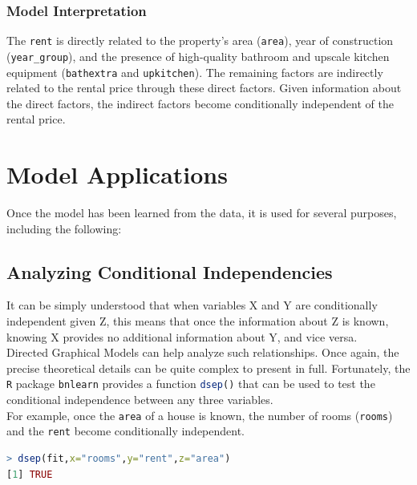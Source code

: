 \documentclass[15pt,a4paper]{report}
\begin{document}
\subsubsection*{Model Interpretation}
 The \lstinline[language=R]|rent| is directly related to the property's area (\lstinline[language=R]|area|), year of construction (\lstinline[language=R]|year_group|), and the presence of high-quality bathroom and upscale kitchen equipment (\lstinline[language=R]|bathextra| and \lstinline[language=R]|upkitchen|). The remaining factors are indirectly related to the rental price through these direct factors. Given information about the direct factors, the indirect factors become conditionally independent of the rental price.
\section*{Model Applications}
Once the model has been learned from the data, it is used for several purposes, including the following:
\subsection*{Analyzing Conditional Independencies}
It can be simply understood that when variables X and Y are conditionally independent given Z, this means that once the information about Z is known, knowing X provides no additional information about Y, and vice versa.\\

Directed Graphical Models can help analyze such relationships. Once again, the precise theoretical details can be quite complex to present in full. Fortunately, the \lstinline[language=R]|R| package \lstinline[language=R]|bnlearn| provides a function \lstinline[language=R]|dsep()| that can be used to test the conditional independence between any three variables. \\

For example, once the \lstinline[language=R]|area| of a house is known, the number of rooms (\lstinline[language=R]|rooms|) and the \lstinline[language=R]|rent| become conditionally independent.

\begin{lstlisting}[language=R]
> dsep(fit,x="rooms",y="rent",z="area")
[1] TRUE
\end{lstlisting}
\end{document}
